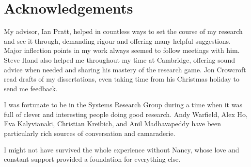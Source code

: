 
\chapter*{Acknowledgements}

My advisor, Ian Pratt, helped in countless ways to set the course of my research and see it through, demanding rigour and offering many helpful suggestions. Major inflection points in my work always seemed to follow meetings with him. Steve Hand also helped me throughout my time at Cambridge, offering sound advice when needed and sharing his mastery of the research game. Jon Crowcroft read drafts of my dissertations, even taking time from his Christmas holiday to send me feedback.

I was fortunate to be in the Systems Research Group during a time when it was full of clever and interesting people doing good research. Andy Warfield, Alex Ho, Eva Kalyvianaki, Christian Kreibich, and Anil Madhavapeddy have been particularly rich sources of conversation and camaraderie.

I might not have survived the whole experience without Nancy, whose love and constant support provided a foundation for everything else.